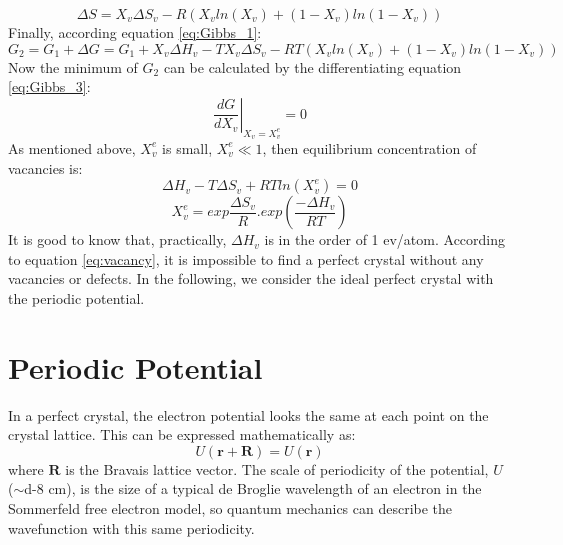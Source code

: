     \begin{equation*}
        \Delta S = X_{v}\Delta S_{v} - R(X_{v}ln(X_{v})+(1-X_{v})ln(1-X_{v}))
    \end{equation*}
    Finally, according equation \ref{eq:Gibbs_1}:
    \begin{equation} \label{eq:Gibbs_3}
        G_{2} = G_{1} + \Delta G = G_{1} + X_{v}\Delta H_{v} - TX_{v}\Delta S_{v} - RT(X_{v}ln(X_{v})+(1-X_{v})ln(1-X_{v}))
    \end{equation}
    Now the minimum of $G_{2}$ can be calculated by the differentiating equation \ref{eq:Gibbs_3}:
    \begin{equation*}
        \left.\frac{dG}{dX_{v}}\right|_{X_{v}=X_{v}^{e}} = 0
    \end{equation*}
    As mentioned above, $X_{v}^{e}$ is small, $X_{v}^{e} \ll 1$, then equilibrium concentration of vacancies is:
    \begin{equation*}
        \Delta H_{v} - T\Delta S_{v} + RTln(X_{v}^{e}) = 0
    \end{equation*}
    \begin{equation} \label{eq:vacancy}
        X_{v}^{e} = exp\frac{\Delta S_{v}}{R}.exp(\frac{-\Delta H_{v}}{RT})
    \end{equation}
    It is good to know that, practically, $\Delta H_{v}$ is in the order of 1 ev/atom.\newline
    According to equation \ref{eq:vacancy}, it is impossible to find a perfect crystal without any vacancies or defects. In the following, we consider the ideal perfect crystal with the periodic potential.

\section{Periodic Potential}


	In a perfect crystal, the electron potential looks the same at each point on the crystal lattice. This can be expressed mathematically as:
	\begin{equation} \label{eq:U_period}
		U(\mathbf{r} + \mathbf{R}) = U(\mathbf{r})
	\end{equation}
	where $\mathbf{R}$ is the Bravais lattice vector. The scale of periodicity of the potential, $U$ ($\sim$\num{d-8} cm), is the size of a typical de Broglie wavelength of an electron in the Sommerfeld free electron model, so quantum mechanics can describe the wavefunction with this same periodicity. 

